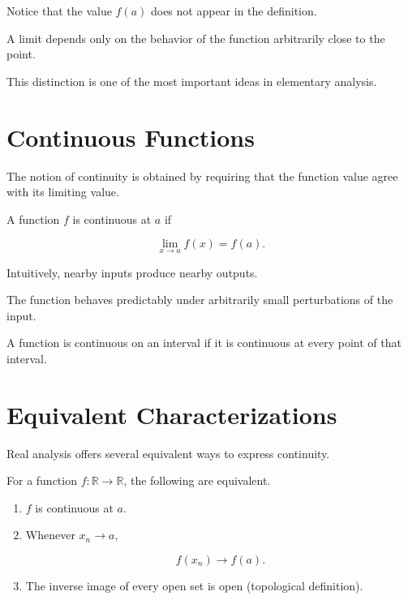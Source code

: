 \documentclass{essay}
\begin{document}
Notice that the value \(f(a)\) does not appear in the definition.

A limit depends only on the behavior of the function arbitrarily close to the
point.

This distinction is one of the most important ideas in elementary analysis.


\section{Continuous Functions}

The notion of continuity is obtained by requiring that the function value agree
with its limiting value.

\begin{definition}

  A function \(f\) is continuous at \(a\) if

  \[ \lim_{x\to a}f(x)=f(a). \]

\end{definition}

Intuitively, nearby inputs produce nearby outputs.

The function behaves predictably under arbitrarily small perturbations of the
input.

\begin{definition}

  A function is continuous on an interval if it is continuous at every point of
  that interval.

\end{definition}


\section{Equivalent Characterizations}

Real analysis offers several equivalent ways to express continuity.

\begin{theorem}

  For a function \(f:\mathbb{R}\rightarrow\mathbb{R}\), the following are
  equivalent.

  \begin{enumerate}
    \item \(f\) is continuous at \(a\).

    \item Whenever \(x_{n}\to a\),

      \[ f(x_{n})\to f(a). \]

    \item The inverse image of every open set is open (topological definition).

  \end{enumerate}

\end{theorem}
\end{document}
